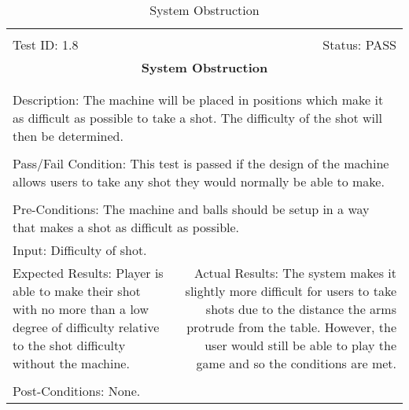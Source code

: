 \documentclass[titlepage]{article}
\begin{document}
\begin{center}
\begin{table}[h!]
\begin{tabular}{|l r|}\hline&\\[-2mm]
	Test ID: 1.8	&Status: PASS\\[-3mm]
	\multicolumn{2}{|c|}{\textbf{\large{System Obstruction}}}\\&\\\hline&\\[-3mm]
	\multicolumn{2}{|p{\textwidth}|}{Description: The machine will be placed in positions which make it as difficult as possible to take a shot. The difficulty of the shot will then be determined.}\\[1mm]\hline&\\[-3mm]
	\multicolumn{2}{|p{\textwidth}|}{Pass/Fail Condition: This test is passed if the design of the machine allows users to take any shot they would normally be able to make.}\\[1mm]\hline&\\[-3mm]
	\multicolumn{2}{|p{\textwidth}|}{Pre-Conditions: The machine and balls should be setup in a way that makes a shot as difficult as possible.}\\[4mm]
	\multicolumn{2}{|p{\textwidth}|}{Input: Difficulty of shot.}\\[2mm]\hline
	\multicolumn{1}{|p{0.49\textwidth}}{Expected Results: Player is able to make their shot with no more than a low degree of difficulty relative to the shot difficulty without the machine.}	&\multicolumn{1}{|p{0.45\textwidth}|}{Actual Results: The system makes it slightly more difficult for users to take shots due to the distance the arms protrude from the table. However, the user would still be able to play the game and so the conditions are met.}\\\hline&\\[-3mm]
	\multicolumn{2}{|p{\textwidth}|}{Post-Conditions: None.}\\\hline
\end{tabular}
\caption{System Obstruction}
\end{table}
\end{center}
\end{document}
